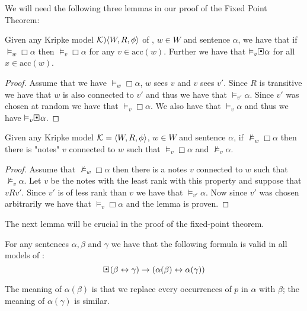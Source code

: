 \documentclass[../main.tex]{subfiles}
\begin{document}
We will need the following three lemmas in our proof of the Fixed Point Theorem:
\begin{lem}
	\label{lem:acc}
	Given any Kripke model $\mathcal{K})\langle W,R,\phi\rangle$ of \GL, $w\in W$ and
	sentence $\alpha$, we have that if $\vDash_w\Box\alpha$ then
	$\vDash_v\Box\alpha$ for any $v\in\text{acc}(w)$. Further we have that
	$\vDash_v\sBox\alpha$ for all $x\in\text{acc}(w)$.
\end{lem}
\begin{proof}
	Assume that we have $\vDash_w\Box\alpha$, $w$ sees  $v$ and
	$v$ sees $v'$. Since $R$ is transitive we have that $w$ is also
	connected to $v'$ and thus we have that $\vDash_{v'}\alpha$. Since
	$v'$ was chosen at random we have that $\vDash_v\Box\alpha$. We also
	have that $\vDash_v\alpha$ and thus we have $\vDash_v\sBox\alpha$.
\end{proof}
\begin{lem}
	\label{lem:con}
	Given any Kripke model $\mathcal{K}=\langle W,R,\phi\rangle$, $w\in W$ and
	sentence $\alpha$, if $\not\vDash_w\Box\alpha$ then there is "notes"
	$v$ connected to $w$ such that $\vDash_v\Box\alpha$ and
	$\not\vDash_v\alpha$.
\end{lem}
\begin{proof}
	Assume that $\not\vDash_w\Box\alpha$ then there is a notes $v$
	connected to $w$ such that $\not\vDash_v\alpha$. Let $v$ be the notes
	with the least rank with this property and suppose that $vRv'$. Since
	$v'$ is of less rank than $v$ we have that $\vDash_{v'}\alpha$. Now
	since $v'$ was chosen arbitrarily we have that $\vDash_v\Box\alpha$ and
	the lemma is proven.
\end{proof}
The next lemma will be crucial in the proof of the fixed-point theorem.
\begin{lem}
	\label{lem:sem}
	For any sentences $\alpha,\beta$ and $\gamma$ we have that the
	following formula is valid in all models of \GL:
	$$\sBox(\beta\leftrightarrow\gamma)\rightarrow(\alpha(\beta)\leftrightarrow\alpha(\gamma))$$
\end{lem}
The meaning of $\alpha(\beta)$ is that we replace every occurrences of $p$ in
$\alpha$ with $\beta$; the meaning of $\alpha(\gamma)$ is similar.
\end{document}
